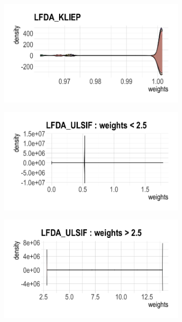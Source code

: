 \documentclass[a4paper,12pt]{article}
\begin{document}
\begin{figure}[H]
\begin{subfigure}{.32\textwidth}
  \label{fig:sfig1}
\end{subfigure}
\begin{subfigure}{.32\textwidth}
  \centering
  \includegraphics[width=\linewidth]{bio7.png}
  \label{fig:sfig2}
\end{subfigure} %
\begin{subfigure}{.32\textwidth}
  \centering
  \includegraphics[width=\linewidth]{bio12.png}
  \label{fig:sfig1}
\end{subfigure}%
\begin{subfigure}{.32\textwidth}
  \centering
  \includegraphics[width=\linewidth]{bio13.png}

\end{subfigure}
\end{figure}
\end{document}
